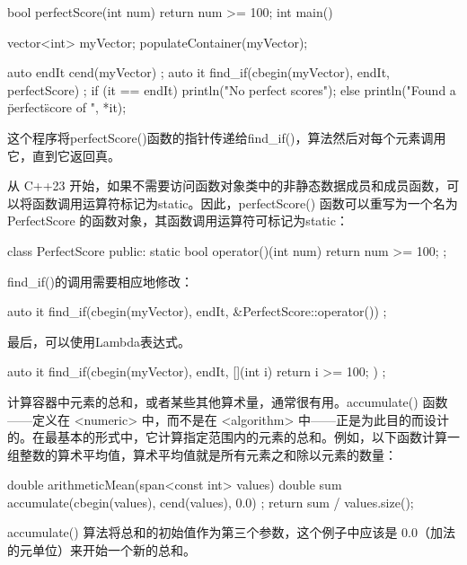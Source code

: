 \begin{cpp}
bool perfectScore(int num) { return num >= 100; }
int main()
{
    vector<int> myVector;
    populateContainer(myVector);

    auto endIt { cend(myVector) };
    auto it { find_if(cbegin(myVector), endIt, perfectScore) };
    if (it == endIt) {
        println("No perfect scores");
    } else {
        println("Found a \"perfect\" score of {}", *it);
    }
}
\end{cpp}

这个程序将perfectScore()函数的指针传递给find\_if()，算法然后对每个元素调用它，直到它返回真。


从 C++23 开始，如果不需要访问函数对象类中的非静态数据成员和成员函数，可以将函数调用运算符标记为static。因此，perfectScore() 函数可以重写为一个名为 PerfectScore 的函数对象，其函数调用运算符可标记为static：

\begin{cpp}
class PerfectScore
{
    public:
        static bool operator()(int num) { return num >= 100; }
};
\end{cpp}

find\_if()的调用需要相应地修改：

\begin{cpp}
auto it { find_if(cbegin(myVector), endIt, &PerfectScore::operator()) };
\end{cpp}

最后，可以使用Lambda表达式。

\begin{cpp}
auto it { find_if(cbegin(myVector), endIt, [](int i){ return i >= 100; }) };
\end{cpp}



计算容器中元素的总和，或者某些其他算术量，通常很有用。accumulate() 函数——定义在 <numeric> 中，而不是在 <algorithm> 中——正是为此目的而设计的。在最基本的形式中，它计算指定范围内的元素的总和。例如，以下函数计算一组整数的算术平均值，算术平均值就是所有元素之和除以元素的数量：

\begin{cpp}
double arithmeticMean(span<const int> values)
{
    double sum { accumulate(cbegin(values), cend(values), 0.0) };
    return sum / values.size();
}
\end{cpp}

accumulate() 算法将总和的初始值作为第三个参数，这个例子中应该是 0.0（加法的元单位）来开始一个新的总和。


